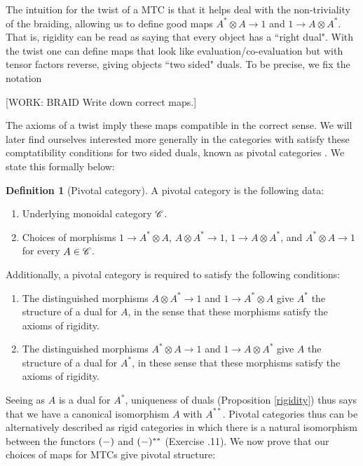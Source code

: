 \documentclass{article}
\theoremstyle{definition}
\newtheorem*{definition}{Definition}
\numberwithin{figure}{section}
\begin{document}
\begin{enumerate}[\thesection .1.]
The intuition for the twist of a MTC is that it helps deal with the non-triviality of the braiding, allowing us to define good maps $A^{*}\otimes A\to 1$ and $1\to A\otimes A^{*}$. That is, rigidity can be read as saying that every object has a ``right dual". With the twist one can define maps that look like evaluation/co-evaluation but with tensor factors reverse, giving objects ``two sided" duals. To be precise, we fix the notation

[WORK: BRAID Write down correct maps.]

The axioms of a twist imply these maps compatible in the correct sense. We will later find ourselves interested more generally in the categories with satisfy these comptatibility conditions for two sided duals, known as pivotal categories \cite{selinger2011survey}. We state this formally below:

\begin{definition}[Pivotal category] A pivotal category is the following data:

\begin{enumerate}
\item Underlying monoidal category $\mathscr{C}$.
\item Choices of morphisms $1\to A^{*}\otimes A$, $A\otimes A^{*}\to 1$, $1\to A\otimes A^{*}$, and $A^{*}\otimes A\to 1$ for every $A\in \mathscr{C}$.
\end{enumerate}

Additionally, a pivotal category is required to satisfy the following conditions:

\begin{enumerate}
\item The distinguished morphisms $A\otimes A^{*}\to 1$ and $1\to A^{*}\otimes A$ give $A^{*}$ the structure of a dual for $A$, in the sense that these morphisms satisfy the axioms of rigidity.

\item The distinguished morphisms $A^{*}\otimes A\to 1$ and $1\to A\otimes A^{*}$ give $A$ the structure of a dual for $A^{*}$, in these sense that these morphisms satisfy the axioms of rigidity.
\end{enumerate}

\raggedleft\qedsymbol{}
\end{definition}

Seeing as $A$ is a dual for $A^{*}$, uniqueness of duals (Proposition \ref{rigidity}) thus says that we have a canonical isomorphism $A$ with $A^{**}$. Pivotal categories thus can be alternatively described as rigid categories in which there is a natural isomorphism between the functors $(\--)$ and $(\--)^{**}$ (Exercise \thesection.11). We now prove that our choices of maps for MTCs give pivotal structure:


\end{enumerate}
\end{document}
